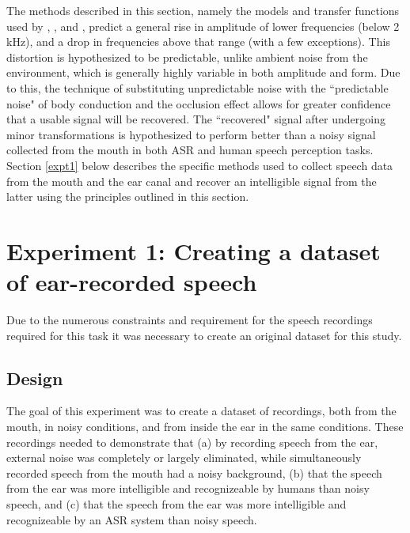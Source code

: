 \documentclass[dissertation,copyright]{uathesis}
\begin{document}


The methods described in this section, namely the models and transfer functions used by \cite{hansen:97b}, \cite{stenfelt:07}, and \cite{reinfeldt:10}, predict a general rise in amplitude of lower frequencies (below 2 kHz), and a drop in frequencies above that range (with a few exceptions).  This distortion is hypothesized to be predictable, unlike ambient noise from the environment, which is generally highly variable in both amplitude and form.  Due to this, the technique of substituting unpredictable noise with the ``predictable noise" of body conduction and the occlusion effect allows for greater confidence that a usable signal will be recovered.  The ``recovered" signal after undergoing minor transformations is hypothesized to perform better than a noisy signal collected from the mouth in both ASR and human speech perception tasks.  Section \ref{expt1} below describes the specific methods used to collect speech data from the mouth and the ear canal and recover an intelligible signal from the latter using the principles outlined in this section.


\section{Experiment 1: Creating a dataset of ear-recorded speech\label{expt1}}

Due to the numerous constraints and requirement for the speech recordings required for this task it was necessary to create an original dataset for this study. 

\subsection{Design}
   
The goal of this experiment was to create a dataset of recordings, both from the mouth, in noisy conditions, and from inside the ear in the same conditions.  These recordings needed to demonstrate that (a) by recording speech from the ear, external noise was completely or largely eliminated, while simultaneously recorded speech from the mouth had a noisy background, (b) that the speech from the ear was more intelligible and recognizeable by humans than noisy speech, and (c) that the speech from the ear was more intelligible and recognizeable by an ASR system than noisy speech. 
\end{document}
